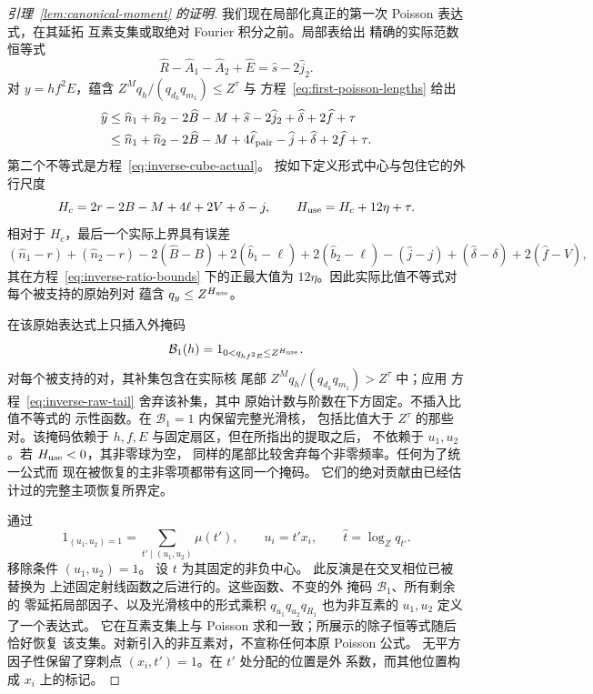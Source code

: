 \documentclass[11pt,a4paper]{article}
\numberwithin{equation}{section}
\numberwithin{figure}{section}
\theoremstyle{definition}
\theoremstyle{remark}
\begin{document}
\begin{proof}[引理~\ref{lem:canonical-moment} 的证明]
我们现在局部化真正的第一次 Poisson 表达式，在其延拓
互素支集或取绝对 Fourier 积分之前。局部表给出
精确的实际范数恒等式
\[
 \widehat R-\widehat A_1-\widehat A_2+\widehat E
       =\widehat s-2\widehat j_2.
\]
对 \(y=hf^2E\)，蕴含
\(Z^Mq_h/(q_{d_k}q_{m_1})\le Z^\tau\) 与
方程~\eqref{eq:first-poisson-lengths} 给出
\[
 \begin{split}
 \widehat y
 &\le \widehat n_1+\widehat n_2-2\widehat B-M
       +\widehat s-2\widehat j_2+\widehat\delta+2\widehat f+\tau\\
 &\le \widehat n_1+\widehat n_2-2\widehat B-M
       +4\widehat\ell_{\rm pair}-\widehat j
       +\widehat\delta+2\widehat f+\tau.
 \end{split}
\]
第二个不等式是方程~\eqref{eq:inverse-cube-actual}。
按如下定义形式中心与包住它的外行尺度
\begin{equation}\label{eq:enlarged-first-frequency}
 H_c=2r-2B-M+4\ell+2V+\delta-j,\qquad
 H_{\rm use}=H_c+12\eta+\tau.
\end{equation}
相对于 \(H_c\)，最后一个实际上界具有误差
\[
 (\widehat n_1-r)+(\widehat n_2-r)-2(\widehat B-B)
 +2(\widehat b_1-\ell)+2(\widehat b_2-\ell)
 -(\widehat j-j)+(\widehat\delta-\delta)+2(\widehat f-V),
\]
其在方程~\eqref{eq:inverse-ratio-bounds} 下的正最大值为
\(12\eta\)。因此实际比值不等式对每个被支持的原始列对
蕴含 \(q_y\le Z^{H_{\rm use}}\)。

在该原始表达式上只插入外掩码
\[
 \mathcal B_1(h)=1_{0<q_{hf^2E}\le Z^{H_{\rm use}}}.
\]
对每个被支持的对，其补集包含在实际核
尾部 \(Z^Mq_h/(q_{d_k}q_{m_1})>Z^\tau\) 中；应用
方程~\eqref{eq:inverse-raw-tail} 舍弃该补集，其中
原始计数与阶数在下方固定。不插入比值不等式的
示性函数。在 \(\mathcal B_1=1\) 内保留完整光滑核，
包括比值大于 \(Z^\tau\) 的那些对。该掩码依赖于
\(h,f,E\) 与固定扇区，但在所指出的提取之后，
不依赖于 \(u_1,u_2\)。若 \(H_{\rm use}<0\)，其非零球为空，
同样的尾部比较舍弃每个非零频率。任何为了统一公式而
现在被恢复的主非零项都带有这同一个掩码。
它们的绝对贡献由已经估计过的完整主项恢复所界定。

通过
\[
 1_{(u_1,u_2)=1}=\sum_{t'\mid(u_1,u_2)}\mu(t'),\qquad u_i=t'x_i,
 \qquad \widehat t=\log_Zq_{t'}.
\]
移除条件 \((u_1,u_2)=1\)。
设 \(t\) 为其固定的非负中心。
此反演是在交叉相位已被替换为
上述固定射线函数之后进行的。这些函数、不变的外
掩码 \(\mathcal B_1\)、所有剩余的
零延拓局部因子、以及光滑核中的形式乘积
\(q_{u_1}q_{u_2}q_{R_1}\) 也为非互素的 \(u_1,u_2\) 定义了一个表达式。
它在互素支集上与 Poisson 求和一致；所展示的除子恒等式随后恰好恢复
该支集。对新引入的非互素对，不宣称任何本原 Poisson 公式。
无平方因子性保留了穿刺点 \((x_i,t')=1\)。在 \(t'\) 处分配的位置是外
系数，而其他位置构成 \(x_i\) 上的标记。


\end{proof}
\end{document}

